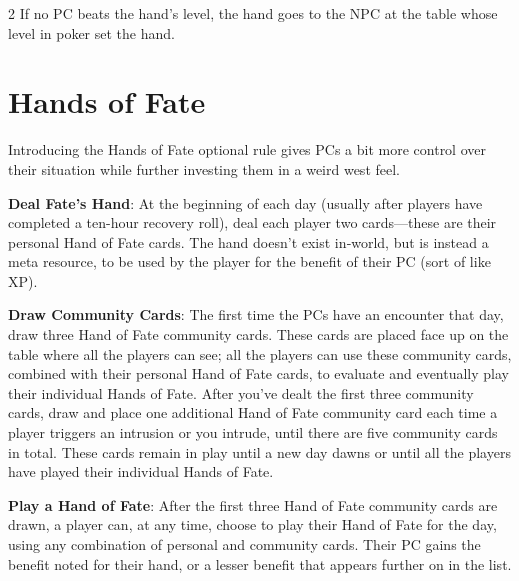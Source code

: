 \begin{multicols}{2}
If no PC beats the hand’s level, the hand goes to the NPC at the table whose level in poker set the hand.

\chapter{Hands of Fate}
 
Introducing the Hands of Fate optional rule gives PCs a bit more control over their situation while further investing them in a weird west feel.

\textbf{Deal Fate’s Hand}: At the beginning of each day (usually after players have completed a ten-hour recovery roll), deal each player two cards—these are their personal Hand of Fate cards. The hand doesn’t exist in‑world, but is instead a meta resource, to be used by the player for the benefit of their PC (sort of like XP).

\textbf{Draw Community Cards}: The first time the PCs have an encounter that day, draw three Hand of Fate community cards. These cards are placed face up on the table where all the players can see; all the players can use these community cards, combined with their personal Hand of Fate cards, to evaluate and eventually play their individual Hands of Fate. After you’ve dealt the first three community cards, draw and place one additional Hand of Fate community card each time a player triggers an intrusion or you intrude, until there are five community cards in total. These cards remain in play until a new day dawns or until all the players have played their individual Hands of Fate.

\textbf{Play a Hand of Fate}: After the first three Hand of Fate community cards are drawn, a player can, at any time, choose to play their Hand of Fate for the day, using any combination of personal and community cards. Their PC gains the benefit noted for their hand, or a lesser benefit that appears further on in the list. 


\end{multicols}
